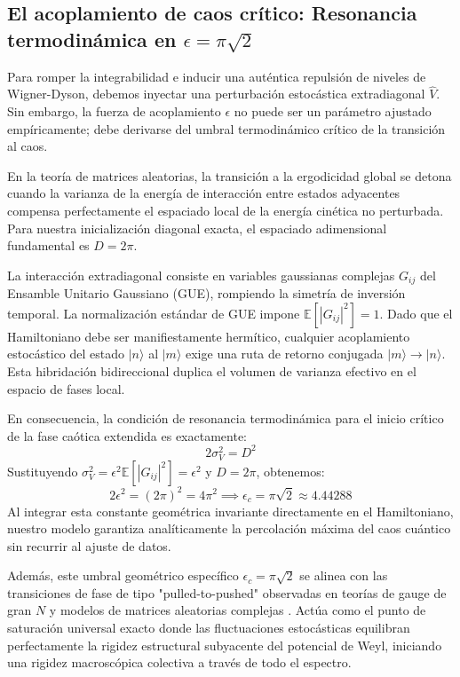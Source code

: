\documentclass[aps,prl,preprint,superscriptaddress,floatfix]{revtex4-2}
\begin{document}
\subsection{El acoplamiento de caos crítico: Resonancia termodinámica en \texorpdfstring{$\epsilon = \pi \sqrt{2}$}{epsilon = pi sqrt(2)}}

Para romper la integrabilidad e inducir una auténtica repulsión de niveles de Wigner-Dyson, debemos inyectar una perturbación estocástica extradiagonal $\hat{V}$. Sin embargo, la fuerza de acoplamiento $\epsilon$ no puede ser un parámetro ajustado empíricamente; debe derivarse del umbral termodinámico crítico de la transición al caos.

En la teoría de matrices aleatorias, la transición a la ergodicidad global se detona cuando la varianza de la energía de interacción entre estados adyacentes compensa perfectamente el espaciado local de la energía cinética no perturbada. Para nuestra inicialización diagonal exacta, el espaciado adimensional fundamental es $D = 2\pi$.

La interacción extradiagonal consiste en variables gaussianas complejas $G_{ij}$ del Ensamble Unitario Gaussiano (GUE), rompiendo la simetría de inversión temporal. La normalización estándar de GUE impone $\mathbb{E}[|G_{ij}|^2] = 1$. Dado que el Hamiltoniano debe ser manifiestamente hermítico, cualquier acoplamiento estocástico del estado $|n\rangle$ al $|m\rangle$ exige una ruta de retorno conjugada $|m\rangle \to |n\rangle$. Esta hibridación bidireccional duplica el volumen de varianza efectivo en el espacio de fases local. 

En consecuencia, la condición de resonancia termodinámica para el inicio crítico de la fase caótica extendida es exactamente:
\begin{equation}
2 \sigma_V^2 = D^2
\end{equation}
Sustituyendo $\sigma_V^2 = \epsilon^2 \mathbb{E}[|G_{ij}|^2] = \epsilon^2$ y $D = 2\pi$, obtenemos:
\begin{equation}
2 \epsilon^2 = (2\pi)^2 = 4\pi^2 \implies \boxed{ \epsilon_c = \pi \sqrt{2} \approx 4.44288 }
\end{equation}
Al integrar esta constante geométrica invariante directamente en el Hamiltoniano, nuestro modelo garantiza analíticamente la percolación máxima del caos cuántico sin recurrir al ajuste de datos.

Además, este umbral geométrico específico $\epsilon_c = \pi\sqrt{2}$ se alinea con las transiciones de fase de tipo "pulled-to-pushed" observadas en teorías de gauge de gran $N$ y modelos de matrices aleatorias complejas \cite{Gross1980, Cunden2018}. Actúa como el punto de saturación universal exacto donde las fluctuaciones estocásticas equilibran perfectamente la rigidez estructural subyacente del potencial de Weyl, iniciando una rigidez macroscópica colectiva a través de todo el espectro.
\end{document}
